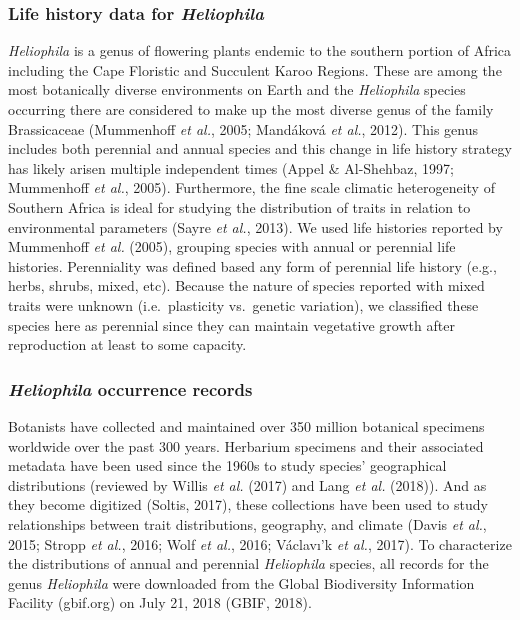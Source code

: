 \documentclass[man,floatsintext]{apa6}
\theoremstyle{definition}
\theoremstyle{definition}
\theoremstyle{definition}
\theoremstyle{remark}
\begin{document}
\hypertarget{life-history-data-for-heliophila}{%
\subsubsection{\texorpdfstring{Life history data for
\emph{Heliophila}}{Life history data for Heliophila}}\label{life-history-data-for-heliophila}}

\emph{Heliophila} is a genus of flowering plants endemic to the southern
portion of Africa including the Cape Floristic and Succulent Karoo
Regions. These are among the most botanically diverse environments on
Earth and the \emph{Heliophila} species occurring there are considered
to make up the most diverse genus of the family Brassicaceae (Mummenhoff
\emph{et al.}, 2005; Mandáková \emph{et al.}, 2012). This genus includes
both perennial and annual species and this change in life history
strategy has likely arisen multiple independent times (Appel \&
Al-Shehbaz, 1997; Mummenhoff \emph{et al.}, 2005). Furthermore, the fine
scale climatic heterogeneity of Southern Africa is ideal for studying
the distribution of traits in relation to environmental parameters
(Sayre \emph{et al.}, 2013). We used life histories reported by
Mummenhoff \emph{et al.} (2005), grouping species with annual or
perennial life histories. Perenniality was defined based any form of
perennial life history (e.g., herbs, shrubs, mixed, etc). Because the
nature of species reported with mixed traits were unknown
(i.e.~plasticity vs.~genetic variation), we classified these species
here as perennial since they can maintain vegetative growth after
reproduction at least to some capacity.

\hypertarget{heliophila-occurrence-records}{%
\subsubsection{\texorpdfstring{\emph{Heliophila} occurrence
records}{Heliophila occurrence records}}\label{heliophila-occurrence-records}}

Botanists have collected and maintained over 350 million botanical
specimens worldwide over the past 300 years. Herbarium specimens and
their associated metadata have been used since the 1960s to study
species' geographical distributions (reviewed by Willis \emph{et al.}
(2017) and Lang \emph{et al.} (2018)). And as they become digitized
(Soltis, 2017), these collections have been used to study relationships
between trait distributions, geography, and climate (Davis \emph{et
al.}, 2015; Stropp \emph{et al.}, 2016; Wolf \emph{et al.}, 2016;
Václavı'k \emph{et al.}, 2017). To characterize the distributions of
annual and perennial \emph{Heliophila} species, all records for the
genus \emph{Heliophila} were downloaded from the Global Biodiversity
Information Facility (gbif.org) on July 21, 2018 (GBIF, 2018).
\end{document}
